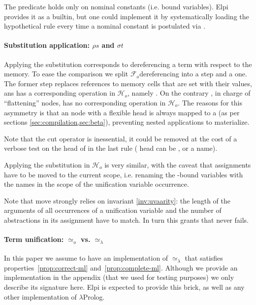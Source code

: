 \documentclass[sigconf,natbib=false,review]{acmart}
\newcommand{\UnifRel}{\ensuremath{\simeq}}
\newcommand{\Uo}{\ensuremath{\UnifRel_o}\xspace}
\newcommand{\Ue}{\ensuremath{\UnifRel_\lambda}\xspace}
\newcommand{\Fo}{\ensuremath{\mathcal{F}_{\!o}\xspace}} %
\newcommand{\Ho}{\ensuremath{\mathcal{H}_o}\xspace}
\begin{document}
\noindent
The  predicate holds only on nominal constants (i.e. bound
variables). Elpi provides it as a builtin, but one could implement it by
systematically loading the hypothetical rule  every time
a nominal constant is postulated via .

\paragraph{Substitution application: $\rho s$ and $\sigma t$}

Applying the substitution corresponds to dereferencing a term with respect to
the memory. To ease the comparison we split \Fo dereferencing into a
 step and a  one. The former step replaces references
to memory cells that are set with their values, ans has a corresponding
operation in \Ho, namely . On the contrary ,
in charge of ``flattening''  nodes, has no corresponding
operation in \Ho. The reasons for this asymmetry is that an 
node with a flexible head is always mapped to a  (as per
sections \ref{sec:compilation,sec:beta}), preventing nested applications to
materialize.



\noindent
Note that the cut operator is inessential, it could be
removed at the cost of a verbose test on the head of 
in the last rule ( head
can be ,  or a name).

Applying the substitution in \Ho{} is very similar, with
the caveat that assignments have to be moved to the
current scope, i.e. renaming the -bound variables
with the names in the scope of the unification variable occurrence.



\noindent
Note that move strongly relies on invariant \ref{inv:uvaarity}: the length
of the arguments of all occurrences of a unification variable and the
number of abstractions in its assignment have to match. In turn
this grants that  never fails.



\paragraph{Term unification: \Uo vs. \Ue}

In this paper we assume to have an implementation of \Ue that satisfies
properties~\ref{prop:correct-ml} and~\ref{prop:complete-ml}. Although we provide an
implementation in the appendix (that we used for testing purposes) we only
describe its signature here. Elpi is expected to provide this brick, as well as
any other implementation of $\lambda$Prolog.
\end{document}
